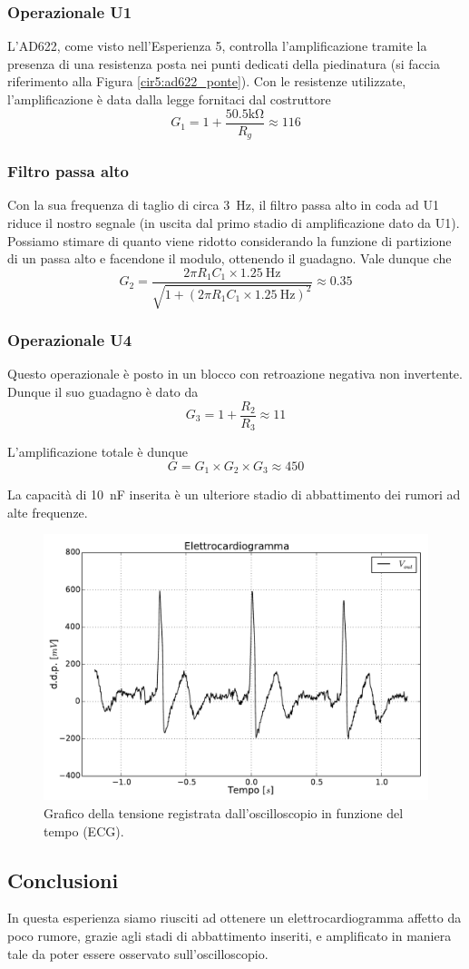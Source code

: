\subsubsection*{Operazionale U1}
L'AD622, come visto nell'Esperienza 5, controlla l'amplificazione tramite la presenza di una resistenza posta nei punti dedicati della piedinatura (si faccia riferimento alla Figura \ref{cir5:ad622_ponte}). Con le resistenze utilizzate, l'amplificazione è data dalla legge  fornitaci dal costruttore
$$G_1=1+\frac{50.5 \si{\kilo\ohm}}{R_g} \approx 116$$

\subsubsection*{Filtro passa alto}
Con la sua frequenza di taglio di circa \SI{3}{\Hz}, il filtro passa alto in coda ad U1 riduce il nostro segnale (in uscita dal primo stadio di amplificazione dato da U1). Possiamo stimare di quanto viene ridotto considerando la funzione di partizione di un passa alto e facendone il modulo, ottenendo il guadagno. Vale dunque che
$$G_2=\frac{2 \pi R_1 C_1 \times \SI{1.25}{\Hz}}{\sqrt{1+(2 \pi R_1 C_1 \times \SI{1.25}{\Hz})^2}}\approx 0.35$$

\subsubsection*{Operazionale U4}
Questo operazionale è posto in un blocco con retroazione negativa non invertente. Dunque il suo guadagno è dato da
$$G_3=1+\frac{R_2}{R_3} \approx 11$$

L'amplificazione totale è dunque
$$G = G_1 \times G_2 \times G_3 \approx 450$$

La capacità di \SI{10}{\nano\farad} inserita è un ulteriore stadio di abbattimento dei rumori ad alte frequenze.


\begin{figure}[htpc]
\centering
\includegraphics[width=.7\textwidth]{../E07/latex/g4.pdf}
\caption{Grafico della tensione registrata dall'oscilloscopio in funzione del tempo (ECG).}
\label{fig7:ecg_output}
\end{figure}

\subsection*{Conclusioni}
In questa esperienza siamo riusciti ad ottenere un elettrocardiogramma affetto da poco rumore, grazie agli stadi di abbattimento inseriti, e amplificato in maniera tale da poter essere osservato sull'oscilloscopio.
